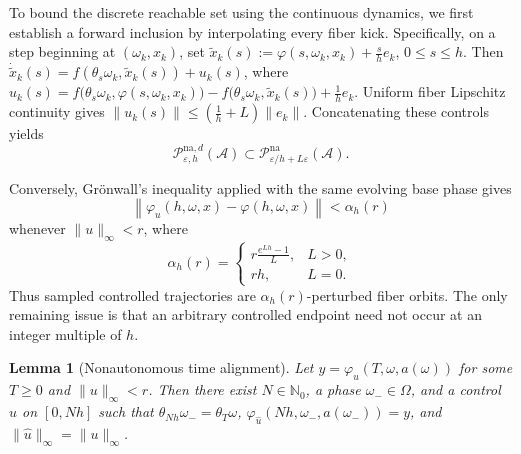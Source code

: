 \documentclass[pdflatex,sn-mathphys-num]{sn-jnl}
\numberwithin{equation}{section}
\theoremstyle{thmstyleone}%
\newtheorem{lemma}[theorem]{Lemma}
\theoremstyle{definition}
\theoremstyle{remark}
\begin{document}
To bound the discrete reachable set using the continuous dynamics, we first establish a forward inclusion by interpolating every fiber kick. Specifically, on a step beginning at $(\omega_k,x_k)$, set $\widetilde x_k(s)
:= \varphi(s,\omega_k,x_k) + \frac{s}{h}e_k$, $0\leq s\leq h$.
Then $\dot{\widetilde x}_k(s) = f(\theta_s\omega_k,\widetilde x_k(s)) +u_k(s)$, where $u_k(s)
    =
    f\bigl(
        \theta_s\omega_k,
        \varphi(s,\omega_k,x_k)
    \bigr)
    -
    f\bigl(
        \theta_s\omega_k,
        \widetilde x_k(s)
    \bigr)
    +
    \frac1h e_k$.
Uniform fiber Lipschitz continuity gives $\|u_k(s)\| \leq \left(\frac1h+L\right)\|e_k\|$. Concatenating these controls yields
\begin{equation}
\label{eq:na-discrete-continuous-inclusion}
    \mathcal P_{\varepsilon,h}^{\mathrm{na},d}
    (\mathcal A)
    \subset
    \mathcal P_{\varepsilon/h+L\varepsilon}^{\mathrm{na}}
    (\mathcal A).
\end{equation}

Conversely, Gr\"onwall's inequality applied with the same evolving base phase gives
\begin{equation}
\label{eq:na-gronwall-one-step}
    \left\|
    \varphi_u(h,\omega,x)
    -
    \varphi(h,\omega,x)
    \right\|
    <
    \alpha_h(r)
\end{equation}
whenever $\|u\|_\infty<r$, where
\[
    \alpha_h(r)
    =
    \begin{cases}
    \displaystyle
    r\frac{e^{Lh}-1}{L},
        &L>0,\\[2ex]
    rh,&L=0.
    \end{cases}
\]
Thus sampled controlled trajectories are $\alpha_h(r)$-perturbed fiber orbits. The only remaining issue is that an arbitrary controlled endpoint need not occur at an integer multiple of $h$.

\begin{lemma}[Nonautonomous time alignment]
\label{lem:nonautonomous-time-alignment}
Let $y=\varphi_u(T,\omega,a(\omega))$ for some $T\geq0$ and $\|u\|_\infty<r$. Then there exist $N\in\mathbb N_0$, a phase $\omega_-\in\Omega$, and a control $\widehat u$ on $[0,Nh]$ such that $\theta_{Nh}\omega_-
    =
    \theta_T\omega$, 
    $\varphi_{\widehat u}
    (Nh,\omega_-,a(\omega_-))
    =
    y$, and 
    $\|\widehat u\|_\infty
    =
    \|u\|_\infty$.
\end{lemma}
\end{document}
